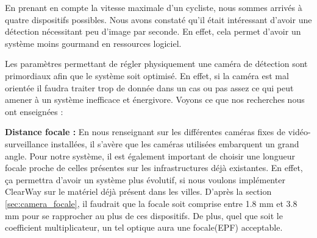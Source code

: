 En prenant en compte la vitesse maximale d'un cycliste, nous sommes arrivés à quatre dispositifs possibles. Nous avons constaté qu'il était intéressant
d'avoir une détection nécessitant peu d'image par seconde. En effet, cela permet d'avoir un système moins gourmand en ressources logiciel.

Les paramètres permettant de régler physiquement une caméra de détection sont primordiaux afin que le système soit optimisé.
En effet, si la caméra est mal orientée il faudra traiter trop de donnée dans un cas ou pas assez ce qui peut amener à un système inefficace et énergivore.
Voyons ce que nos recherches nous ont enseignées :
\newline \newline

\textbf{Distance focale :}
\newline
En nous renseignant sur les différentes caméras fixes de vidéo-surveillance installées, il s’avère que les caméras utilisées embarquent un grand angle.
Pour notre système, il est également important de choisir une longueur focale proche de celles présentes sur les infrastructures déjà existantes.
En effet, ça permettra d'avoir un système plus évolutif, si nous voulons implémenter ClearWay sur le matériel déjà présent dans les villes.
D'après la section \ref{sec:camera_focale}, il faudrait que la focale soit comprise entre 1.8 mm et 3.8 mm pour se rapprocher au plus de ces dispositifs.
De plus, quel que soit le coefficient multiplicateur, un tel optique aura une focale(EPF) acceptable.
\newline \newline


